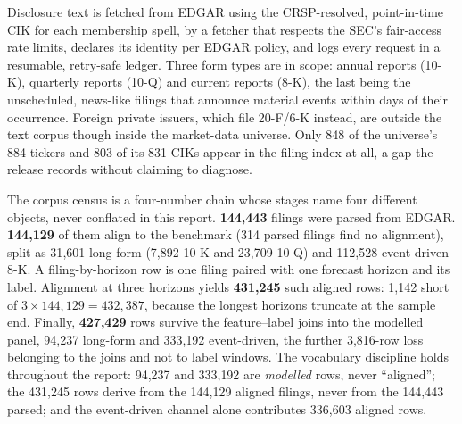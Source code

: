 Disclosure text is fetched from EDGAR using the CRSP-resolved, point-in-time CIK for each membership spell, by a fetcher that respects the SEC's fair-access rate limits, declares its identity per EDGAR policy, and logs every request in a resumable, retry-safe ledger. Three form types are in scope: annual reports (10-K), quarterly reports (10-Q) and current reports (8-K), the last being the unscheduled, news-like filings that announce material events within days of their occurrence. Foreign private issuers, which file 20-F/6-K instead, are outside the text corpus though inside the market-data universe. Only 848 of the universe's 884 tickers and 803 of its 831 CIKs appear in the filing index at all, a gap the release records without claiming to diagnose. %

The corpus census is a four-number chain whose stages name four different objects, never conflated in this report. \textbf{144{,}443} filings were parsed from EDGAR. \textbf{144{,}129} of them align to the benchmark (314 parsed filings find no alignment), split as 31{,}601 long-form (7{,}892 10-K and 23{,}709 10-Q) and 112{,}528 event-driven 8-K. %
A filing-by-horizon row is one filing paired with one forecast horizon and its label. Alignment at three horizons yields \textbf{431{,}245} such aligned rows: 1{,}142 short of $3\times144{,}129=432{,}387$, because the longest horizons truncate at the sample end. %
Finally, \textbf{427{,}429} rows survive the feature--label joins into the modelled panel, 94{,}237 long-form and 333{,}192 event-driven, the further 3{,}816-row loss belonging to the joins and not to label windows. %
The vocabulary discipline holds throughout the report: 94{,}237 and 333{,}192 are \emph{modelled} rows, never ``aligned''; the 431{,}245 rows derive from the 144{,}129 aligned filings, never from the 144{,}443 parsed; and the event-driven channel alone contributes 336{,}603 aligned rows. %

